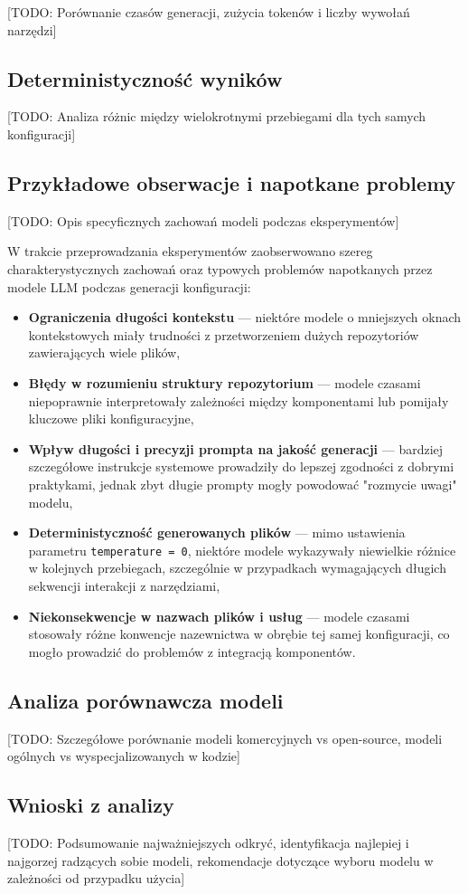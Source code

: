 [TODO: Porównanie czasów generacji, zużycia tokenów i liczby wywołań narzędzi]

\subsection{Deterministyczność wyników}

[TODO: Analiza różnic między wielokrotnymi przebiegami dla tych samych konfiguracji]

\subsection{Przykładowe obserwacje i napotkane problemy}

[TODO: Opis specyficznych zachowań modeli podczas eksperymentów]

W trakcie przeprowadzania eksperymentów zaobserwowano szereg charakterystycznych zachowań oraz typowych problemów napotkanych przez modele LLM podczas generacji konfiguracji:

\begin{itemize}
    \item \textbf{Ograniczenia długości kontekstu} — niektóre modele o mniejszych oknach kontekstowych miały trudności z przetworzeniem dużych repozytoriów zawierających wiele plików,
    \item \textbf{Błędy w rozumieniu struktury repozytorium} — modele czasami niepoprawnie interpretowały zależności między komponentami lub pomijały kluczowe pliki konfiguracyjne,
    \item \textbf{Wpływ długości i precyzji prompta na jakość generacji} — bardziej szczegółowe instrukcje systemowe prowadziły do lepszej zgodności z dobrymi praktykami, jednak zbyt długie prompty mogły powodować "rozmycie uwagi" modelu,
    \item \textbf{Deterministyczność generowanych plików} — mimo ustawienia parametru \texttt{temperature = 0}, niektóre modele wykazywały niewielkie różnice w kolejnych przebiegach, szczególnie w przypadkach wymagających długich sekwencji interakcji z narzędziami,
    \item \textbf{Niekonsekwencje w nazwach plików i usług} — modele czasami stosowały różne konwencje nazewnictwa w obrębie tej samej konfiguracji, co mogło prowadzić do problemów z integracją komponentów.
\end{itemize}

\subsection{Analiza porównawcza modeli}

[TODO: Szczegółowe porównanie modeli komercyjnych vs open-source, modeli ogólnych vs wyspecjalizowanych w kodzie]

\subsection{Wnioski z analizy}

[TODO: Podsumowanie najważniejszych odkryć, identyfikacja najlepiej i najgorzej radzących sobie modeli, rekomendacje dotyczące wyboru modelu w zależności od przypadku użycia]